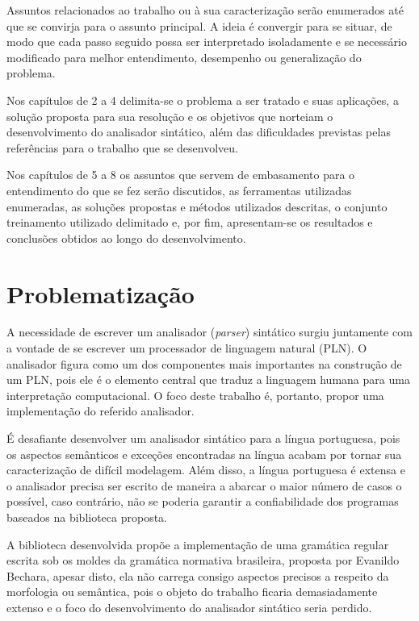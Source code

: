 \documentclass[12pt,a4paper,oneside,english,brazilian,brazil]{abntex2}
\begin{document}
\par Assuntos relacionados ao trabalho ou à sua caracterização serão enumerados até que se convirja para o assunto principal. A ideia é convergir para se situar, de modo que cada passo seguido possa ser interpretado isoladamente e se necessário modificado para melhor entendimento, desempenho ou generalização do problema.\

\par Nos capítulos de 2 a 4 delimita-se o problema a ser tratado e suas aplicações, a solução proposta para sua resolução e os objetivos que norteiam o desenvolvimento do analisador sintático, além das dificuldades previstas pelas referências para o trabalho que se desenvolveu. \

\par Nos capítulos de 5 a 8 os assuntos que servem de embasamento para o entendimento do que se fez serão discutidos, as ferramentas utilizadas enumeradas, as soluções propostas e métodos utilizados descritas, o conjunto treinamento utilizado delimitado e, por fim, apresentam-se os resultados e conclusões obtidos ao longo do desenvolvimento. \

\pagebreak

\chapter{Problematização}


\par A necessidade de escrever um analisador (\textit{parser}) sintático surgiu juntamente com a vontade de se escrever um processador de linguagem natural (PLN). O analisador figura como um dos componentes mais importantes na construção de um PLN, pois ele é o elemento central que traduz a linguagem humana para uma interpretação computacional. O foco deste trabalho é, portanto, propor uma implementação do referido analisador.\

\par É desafiante desenvolver um analisador sintático para a língua portuguesa, pois os aspectos semânticos e exceções encontradas na língua acabam por tornar sua caracterização de difícil modelagem. Além disso, a língua portuguesa é extensa e o analisador precisa ser escrito de maneira a abarcar o maior número de casos o possível, caso contrário, não se poderia garantir a confiabilidade dos programas baseados na biblioteca proposta.\

\par A biblioteca desenvolvida propõe a implementação de uma gramática regular escrita sob os moldes da gramática normativa brasileira, proposta por Evanildo Bechara, apesar disto, ela não carrega consigo aspectos precisos a respeito da morfologia ou semântica, pois o objeto do trabalho ficaria demasiadamente extenso e o foco do desenvolvimento do analisador sintático seria perdido.\
\end{document}

